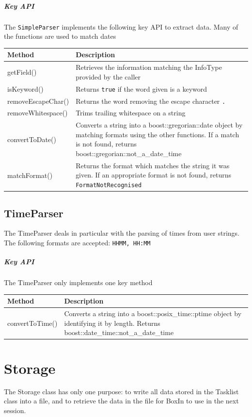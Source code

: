 \documentclass[12pt]{extarticle}
\begin{document}
\subparagraph{Key API}The \texttt{SimpleParser} implements the following key API to extract data. Many of the functions are used to match dates\\
\begin{tabular}{p{6cm} p{12cm}}
Method & Description\\
\hline
getField() & Retrieves the information matching the InfoType provided by the caller\\
isKeyword() & Returns \texttt{true} if the word given is a keyword\\
removeEscapeChar() & Returns the word removing the escape character \texttt{.}\\
removeWhitespace() & Trims trailing whitespace on a string\\
convertToDate() & Converts a string into a boost::gregorian::date object by matching formats using the other functions. If a match is not found, returns boost::gregorian::not\_a\_date\_time\\
matchFormat() & Returns the format which matches the string it was given. If an appropriate format is not found, returns \texttt{FormatNotRecognised}\\
\end{tabular}

\subsection{TimeParser}
The TimeParser deals in particular with the parsing of times from user strings. The following formats are accepted: \texttt{HHMM, HH:MM}

\subparagraph{Key API}
The TimeParser only implements one key method\\
\begin{tabular}{p{6cm} p{12cm}}
Method & Description\\
\hline
convertToTime() & Converts a string into a boost::posix\_time::ptime object by identifying it by length. Returns boost::date\_time::not\_a\_date\_time
\end{tabular}

\newpage

\section{Storage}
The Storage class has only one purpose: to write all data stored in the Tasklist class into a file, and to retrieve the data in the file for BoxIn to use in the next session. 
\end{document}
